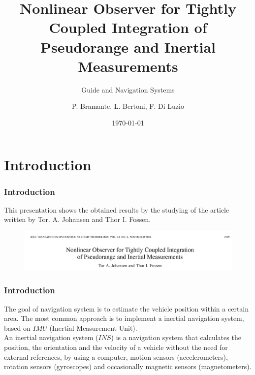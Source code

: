 \documentclass{beamer}
\title{Nonlinear Observer for Tightly Coupled Integration of Pseudorange and Inertial Measurements}
\subtitle{Guide and Navigation Systems}
\author{P. Bramante, L. Bertoni, F. Di Luzio}
\institute{Universit\`a degli Studi di Pisa \\ Master's Degree in Robotics and Automation Engineering}
\date{\today}
\begin{document}
	
	\begin{frame}
	\titlepage
	\end{frame}	



\section{Introduction}
	\begin{frame}
		\frametitle{Introduction}
		This presentation shows the obtained results by the studying of the article written by Tor. A. Johansen and Thor I. Fossen.
		
	\begin{figure}[H]
			\centering
			\includegraphics[scale=0.3]{title}
		\end{figure}
	\end{frame}

	\begin{frame}
		\frametitle{Introduction}
	The goal of navigation system is to estimate the vehicle position within a certain area. The most common approach is to implement a inertial navigation system, based on $IMU$ (Inertial Measurement Unit).\\
	\vspace{0.3cm}
	An inertial navigation system ($INS$) is a navigation system that calculates the position, the orientation and the velocity of a vehicle without the need for external references, by using a computer, motion sensors (accelerometers), rotation sensors (gyroscopes) and occasionally magnetic sensors (magnetometers).
	
	
	\end{frame}
\end{document}
